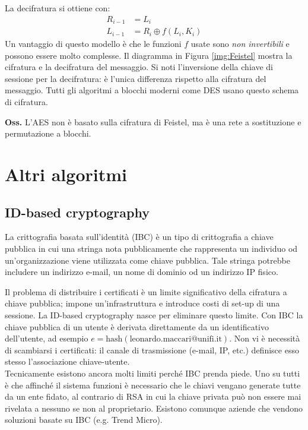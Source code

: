 La decifratura si ottiene con:
\begin{align*}
	R_{i-1} &= L_i \\
	L_{i-1} &= R_i \oplus f(L_i, K_i)
\end{align*}
Un vantaggio di questo modello è che le funzioni $f$ usate sono \textit{non invertibili} e possono essere molto complesse. Il diagramma in Figura \ref{img:Feistel} mostra la cifratura e la decifratura del messaggio. Si noti l'inversione della chiave di sessione per la decifratura: è l'unica differenza rispetto alla cifratura del messaggio. Tutti gli algoritmi a blocchi moderni come DES usano questo schema di cifratura. 

\textbf{Oss.} L'AES non è basato sulla cifratura di Feistel, ma è una rete a sostituzione e permutazione a blocchi.

\section{Altri algoritmi}

\subsection{ID-based cryptography}
La crittografia basata sull'identità (IBC) è un tipo di crittografia a chiave pubblica in cui una stringa nota pubblicamente che rappresenta un individuo od un'organizzazione viene utilizzata come chiave pubblica. Tale stringa potrebbe includere un indirizzo e-mail, un nome di dominio od un indirizzo IP fisico.

Il problema di distribuire i certificati è un limite significativo della cifratura a chiave pubblica; impone un'infrastruttura e introduce costi di set-up di una sessione. La ID-based cryptography nasce per eliminare questo limite. Con IBC la chiave pubblica di un utente è derivata direttamente da un identificativo dell'utente, ad esempio $e=\text{hash}(\text{leonardo.maccari@unifi.it})$. Non vi è necessità di scambiarsi i certificati: il canale di trasmissione (e-mail, IP, etc.) definisce esso stesso l'associazione chiave-utente.\\
Tecnicamente esistono ancora molti limiti perché IBC prenda piede. Uno su tutti è che affinché il sistema funzioni è necessario che le chiavi vengano generate tutte da un ente fidato, al contrario di RSA in cui la chiave privata può non essere mai rivelata a nessuno se non al proprietario. Esistono comunque aziende che vendono soluzioni basate su IBC (e.g. Trend Micro).

